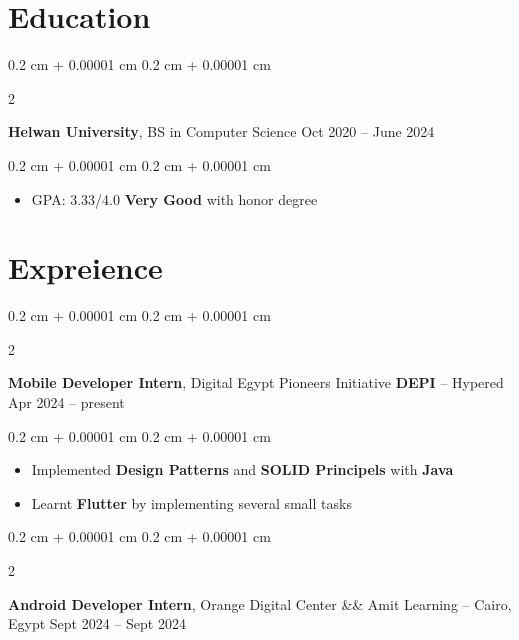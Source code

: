 \documentclass[10pt, letterpaper]{article}
\newenvironment{highlights}{
    \begin{itemize}[
        topsep=0.10 cm,
        parsep=0.10 cm,
        partopsep=0pt,
        itemsep=0pt,
        leftmargin=0.4 cm + 10pt
    ]
}{
    \end{itemize}
} %
\newenvironment{onecolentry}{
    \begin{adjustwidth}{
        0.2 cm + 0.00001 cm
    }{
        0.2 cm + 0.00001 cm
    }
}{
    \end{adjustwidth}
} %
\newenvironment{twocolentry}[2][]{
    \onecolentry
    \def\secondColumn{#2}
    \setcolumnwidth{\fill, 4.5 cm}
    \begin{paracol}{2}
}{
    \switchcolumn \raggedleft \secondColumn
    \end{paracol}
    \endonecolentry
} %
\begin{document}
    
    \section{Education}



        
        \begin{twocolentry}{
            Oct 2020 – June 2024
        }
            \textbf{Helwan University}, BS in Computer Science\end{twocolentry}

        \vspace{0.10 cm}
        \begin{onecolentry}
            \begin{highlights}
                \item GPA: 3.33/4.0 \textbf{Very Good} with honor degree
            \end{highlights}
        \end{onecolentry}



    
    \section{Expreience}



        
        \begin{twocolentry}{
            Apr 2024 – present
        }
            \textbf{Mobile Developer Intern}, Digital Egypt Pioneers Initiative \textbf{DEPI} -- Hypered\end{twocolentry}

        \vspace{0.10 cm}
        \begin{onecolentry}
            \begin{highlights}
                \item Implemented \textbf{Design Patterns} and \textbf{SOLID Principels} with \textbf{Java}
                \item Learnt \textbf{Flutter} by implementing several small tasks
            \end{highlights}
        \end{onecolentry}


        \vspace{0.2 cm}

        \begin{twocolentry}{
            Sept 2024 – Sept 2024
        }
            \textbf{Android Developer Intern}, Orange Digital Center \&\& Amit Learning -- Cairo, Egypt\end{twocolentry}
\end{document}

